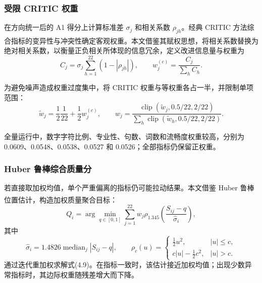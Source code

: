 \documentclass[bwprint]{gmcmthesis}
\DeclareMathOperator{\clip}{clip}
\begin{document}
        
        \subsubsection{受限 CRITIC 权重}    %
        在方向统一后的 A1 得分上计算标准差 $\sigma_j$ 和相关系数 $\rho_{jh}$。经典 CRITIC 方法综合指标的变异性与冲突性确定客观权重\textsuperscript{\cite{diakoulaki1995critic}}。本文借鉴其赋权思想，将相关系数替换为绝对相关系数，以衡量正负相关所体现的信息冗余，定义改进信息量与权重为
        \begin{equation}
        C_j=\sigma_j\sum_{h=1}^{22}(1-|\rho_{jh}|),\qquad
        w_j^{(c)}=\frac{C_j}{\sum_hC_h}.
        \label{eq:critic}
        \end{equation}
        
        为避免噪声造成权重过度集中，将 CRITIC 权重与等权重各占一半，并限制单项范围：
        \begin{equation}
        \widetilde w_j=\frac12\frac1{22}+\frac12w_j^{(c)},\qquad
        w_j=\frac{\clip(\widetilde w_j,0.5/22,2/22)}
        {\sum_h\clip(\widetilde w_h,0.5/22,2/22)}.
        \label{eq:weight}
        \end{equation}
        
        全量运行中，数字字符比例、专业性、句数、词数和流畅度权重较高，分别为 0.0609、0.0548、0.0538、0.0527 和 0.0526；全部指标仍保留正权重。

        
        \subsubsection{Huber 鲁棒综合质量分}   %
        若直接取加权均值，单个严重偏离的指标仍可能拉动结果。本文借鉴 Huber 鲁棒位置估计\textsuperscript{\cite{huber1964robust}}，构造加权质量聚合目标：
        \begin{equation}
        Q_i=\arg\min_{q\in[0,1]}\sum_{j=1}^{22}w_j
        \rho_{1.345}\!\left(\frac{S_{ij}-q}{\widehat\sigma_i}\right),
        \label{eq:huberq}
        \end{equation}
        其中
        \begin{equation}
        \widehat\sigma_i=1.4826\operatorname{median}_{j}|S_{ij}-q|,
        \qquad
        \rho_c(u)=\begin{cases}
        \tfrac12u^2,&|u|\le c,\\
        c|u|-\tfrac12c^2,&|u|>c.
        \end{cases}
        \label{eq:huber}
        \end{equation}
        通过迭代重加权求解式(4.9)。在指标一致时，该估计接近加权均值；出现少数异常指标时，其边际权重随残差增大而下降。
\end{document}
